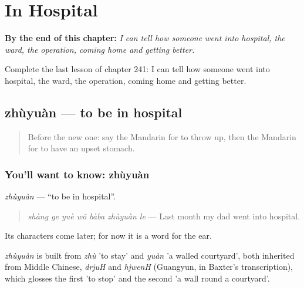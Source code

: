 
\chapter{In Hospital}
\label{ch:zh-in-hospital}

\begin{chapteropening}
\textbf{By the end of this chapter:} \emph{I can tell how someone went into hospital, the ward, the operation, coming home and getting better.}

Complete the last lesson of chapter 241: I can tell how someone went into hospital, the ward, the operation, coming home and getting better.
\end{chapteropening}

\section[zhùyuàn]{zhùyuàn — to be in hospital}

\label{lesson:ZH-C241-zhuyuan}



\begin{quote}
Before the new one: say the Mandarin for to throw up, then the Mandarin for to have an upset stomach.
\end{quote}

\subsection*{You'll want to know: zhùyuàn}
\emph{zhùyuàn} — \textquotedblleft{}to be in hospital\textquotedblright{}.

\begin{quote}
\emph{shàng ge yuè wǒ bàba zhùyuàn le} — Last month my dad went into hospital.
\end{quote}

Its characters come later; for now it is a word for the ear.

\begin{cousinweb}
\emph{zhùyuàn} is built from \emph{zhù} 'to stay' and \emph{yuàn} 'a walled courtyard', both inherited from Middle Chinese, \emph{drjuH} and \emph{hjwenH} (Guangyun, in Baxter's transcription), which glosses the first 'to stop' and the second 'a wall round a courtyard'.
\end{cousinweb}

